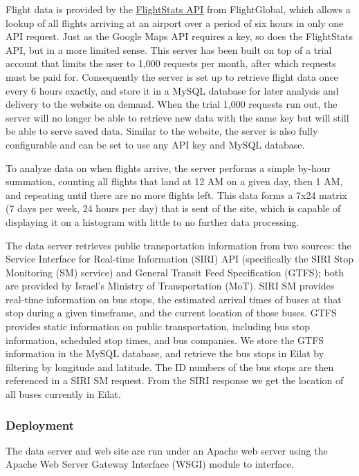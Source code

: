\documentclass[12pt]{article}                       %
\begin{document}
Flight data is provided by the \underline{\href{https://www.flightstats.com/v2/}{FlightStats API}} from FlightGlobal, which allows a lookup of all flights arriving at an airport over a period of six hours in only one API request. Just as the Google Maps API requires a key, so does the FlightStats API, but in a more limited sense. This server has been built on top of a trial account that limits the user to 1,000 requests per month, after which requests must be paid for. Consequently the server is set up to retrieve flight data once every 6 hours exactly, and store it in a MySQL database for later analysis and delivery to the website on demand. When the trial 1,000 requests run out, the server will no longer be able to retrieve new data with the same key but will still be able to serve saved data. Similar to the website, the server is also fully configurable and can be set to use any API key and MySQL database.

To analyze data on when flights arrive, the server performs a simple by-hour summation, counting all flights that land at 12 AM on a given day, then 1 AM, and repeating until there are no more flights left. This data forms a 7x24 matrix (7 days per week, 24 hours per day) that is sent of the site, which is capable of displaying it on a histogram with little to no further data processing.

The data server retrieves public transportation information from two sources: the Service Interface for Real-time Information (SIRI) API (specifically the SIRI Stop Monitoring (SM) service) and General Transit Feed Specification (GTFS); both are provided by Israel's Ministry of Transportation (MoT). SIRI SM provides real-time information on bus stops, the estimated arrival times of buses at that stop during a given timeframe, and the current location of those buses. GTFS provides static information on public transportation, including bus stop information, scheduled stop times, and bus companies. We store the GTFS information in the MySQL database, and retrieve the bus stops in Eilat by filtering by longitude and latitude. The ID numbers of the bus stops are then referenced in a SIRI SM request. From the SIRI response we get the location of all buses currently in Eilat.

\subsubsection{Deployment}
The data server and web site are run under an Apache web server using the Apache Web Server Gateway Interface (WSGI) module to interface.
\end{document}

